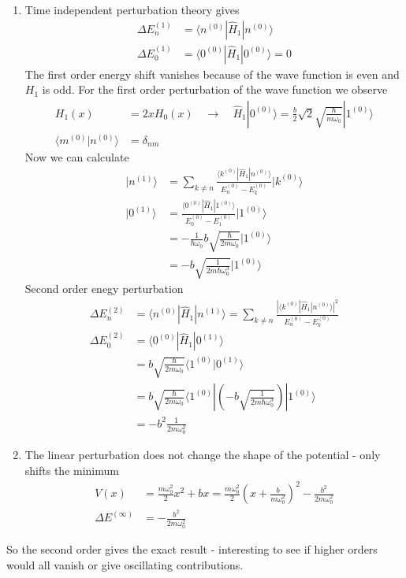 \documentclass[10pt,a4paper]{book}
\theoremstyle{definition}
\begin{document}
\begin{enumerate}
\item Time independent perturbation theory gives
\begin{align}
\Delta E_n^{(1)}&=\langle n^{(0)}|\hat{H}_1|n^{(0)}\rangle\\
\Delta E_0^{(1)}&=\langle 0^{(0)}|\hat{H}_1|0^{(0)}\rangle =0
\end{align}
The first order energy shift vanishes because of the wave function is even and $H_1$ is odd.
For the first order perturbation of the wave function we observe
\begin{align}
H_1(x)&=2xH_0(x)\quad\rightarrow\quad\hat{H}_1|0^{(0)}\rangle=\frac{b}{2}\sqrt{2}\sqrt{\frac{\hbar}{m\omega_0}}|1^{(0)}\rangle\\
\langle m^{(0)}|n^{(0)}\rangle&=\delta_{nm}
\end{align}
Now we can calculate  
\begin{align}
|n^{(1)}\rangle&=\sum_{k\neq n}\frac{\langle k^{(0)}|\hat{H}_1|n^{(0)}\rangle}{E_n^{(0)}-E_k^{(0)}}|k^{(0)}\rangle\\
|0^{(1)}\rangle&=\frac{\langle 0^{(0)}|\hat{H}_1|1^{(0)}\rangle}{E_0^{(0)}-E_1^{(0)}}|1^{(0)}\rangle\\
&=-\frac{1}{\hbar\omega_0}b\sqrt{\frac{\hbar}{2m\omega_0}}|1^{(0)}\rangle\\
&=-b\sqrt{\frac{1}{2m\hbar\omega_0^3}}|1^{(0)}\rangle
\end{align}
Second order enegy perturbation
\begin{align}
\Delta E_n^{(2)}&=\langle n^{(0)}|\hat{H}_1|n^{(1)}\rangle=\sum_{k\neq n}\frac{|\langle k^{(0)}|\hat{H}_1|n^{(0)}\rangle|^2}{E_n^{(0)}-E_k^{(0)}}\\
\Delta E_0^{(2)}&=\langle 0^{(0)}|\hat{H}_1|0^{(1)}\rangle\\
&=b\sqrt{\frac{\hbar}{2m\omega_0}}\langle 1^{(0)}|0^{(1)}\rangle\\
&=b\sqrt{\frac{\hbar}{2m\omega_0}}\langle 1^{(0)}|\left(-b\sqrt{\frac{1}{2m\hbar\omega_0^3}}\right)|1^{(0)}\rangle\\
&=-b^2\frac{1}{2m\omega_0^2}
\end{align}
\item The linear perturbation does not change the shape of the potential - only shifts the minimum 
\begin{align}
 V(x)&=\frac{m\omega_0^2}{2}x^2+bx=\frac{m\omega_0^2}{2}\left(x+\frac{b}{m\omega_0^2}\right)^2-\frac{b^2}{2m\omega_0^2}\\
\Delta E^{(\infty)}&=-\frac{b^2}{2m\omega_0^2} 
\end{align}
\end{enumerate}
So the second order gives the exact result - interesting to see if higher orders would all  vanish or give oscillating contributions.  
\end{document}
